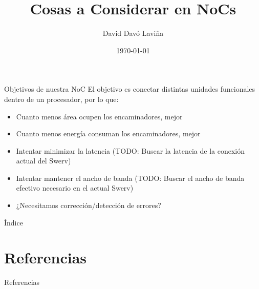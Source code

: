 \documentclass[aspectratio=169,svgnames,handout]{beamer}
\title{Cosas a Considerar en NoCs}
\author{David Davó Laviña}
\date{\today{}}
\begin{document}
\frame[plain]{\titlepage}

\begin{frame}{Objetivos de nuestra NoC}
    El objetivo es conectar distintas unidades funcionales dentro de un procesador, por lo que:
   \begin{itemize}
       \item Cuanto menos área ocupen los encaminadores, mejor
       \item Cuanto menos energía consuman los encaminadores, mejor
       \item Intentar minimizar la latencia (TODO: Buscar la latencia de la conexión actual del Swerv)
       \item Intentar mantener el ancho de banda (TODO: Buscar el ancho de banda efectivo necesario en el actual Swerv)
       \item ¿Necesitamos corrección/detección de errores?
   \end{itemize} 
\end{frame}

\setcounter{tocdepth}{2}
\begin{frame}[allowframebreaks]{Índice}
  \tableofcontents
\end{frame}






\section*{Referencias}
\begin{frame}[allowframebreaks]{Referencias}
    \nocite{*}
    \printbibliography
\end{frame}
\end{document}
